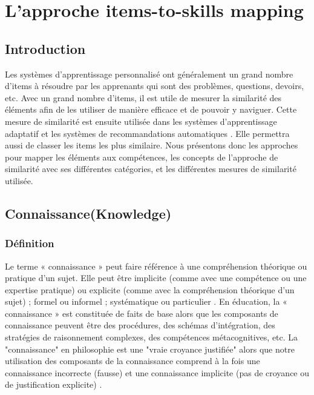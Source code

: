 \chapter{L'approche items-to-skills mapping}
\minitoc
\thispagestyle{empty}
\newpage
\section{Introduction}
Les systèmes d'apprentissage personnalisé ont généralement un grand nombre d’items à résoudre par les apprenants qui sont des problèmes, questions, devoirs, etc. Avec un grand nombre d’items, il est utile de mesurer la similarité des éléments afin de les utiliser de manière efficace et de pouvoir y naviguer. Cette mesure de similarité est ensuite utilisée dans les systèmes d'apprentissage adaptatif et les systèmes de recommandations automatiques \cite{pelanek2018measuring}. Elle permettra aussi de classer les items les plus similaire. Nous présentons donc les approches pour mapper les éléments aux compétences, les concepts de l’approche de similarité avec ses différentes catégories, et les différentes mesures de similarité utilisée.
\section{Connaissance(Knowledge)}
\subsection{Définition}
Le terme « connaissance » peut faire référence à une compréhension théorique ou pratique d'un sujet. Elle peut être implicite (comme avec une compétence ou une expertise pratique) ou explicite (comme avec la compréhension théorique d'un sujet) ; formel ou informel ; systématique ou particulier \cite{knowledge_definition}. En éducation, la « connaissance » est constituée de faits de base alors que les composants de connaissance peuvent être des procédures, des schémas d’intégration, des stratégies de raisonnement complexes, des compétences métacognitives, etc. La "connaissance" en philosophie est une "vraie croyance justifiée" alors que notre utilisation des composants de la connaissance comprend à la fois une connaissance incorrecte (fausse) et une connaissance implicite (pas de croyance ou de justification explicite) \cite{bloom1956taxonomy}.
